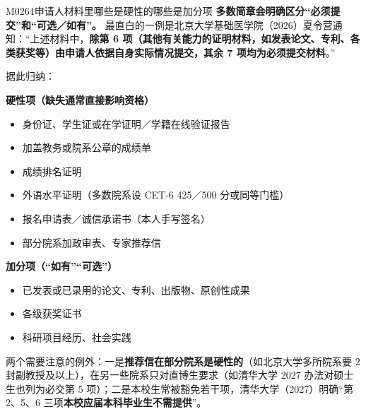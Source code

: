 \begin{qa}{M0264}{申请人材料里哪些是硬性的哪些是加分项}
\textbf{多数简章会明确区分“必须提交”和“可选／如有”。} 最直白的一例是北京大学基础医学院（2026）夏令营通知：“上述材料中，\textbf{除第 6 项（其他有关能力的证明材料，如发表论文、专利、各类获奖等）由申请人依据自身实际情况提交，其余 7 项均为必须提交材料}。”

据此归纳：

\textbf{硬性项（缺失通常直接影响资格）}
\begin{itemize}
  \item 身份证、学生证或在学证明／学籍在线验证报告
  \item 加盖教务或院系公章的成绩单
  \item 成绩排名证明
  \item 外语水平证明（多数院系设 CET-6 425／500 分或同等门槛）
  \item 报名申请表／诚信承诺书（本人手写签名）
  \item 部分院系加政审表、专家推荐信
\end{itemize}

\textbf{加分项（“如有”“可选”）}
\begin{itemize}
  \item 已发表或已录用的论文、专利、出版物、原创性成果
  \item 各级获奖证书
  \item 科研项目经历、社会实践
\end{itemize}

两个需要注意的例外：一是\textbf{推荐信在部分院系是硬性的}（如北京大学多所院系要 2 封副教授及以上），在另一些院系只对直博生要求（如清华大学 2027 办法对硕士生也列为必交第 5 项）；二是本校生常被豁免若干项，清华大学（2027）明确“第 2、5、6 三项\textbf{本校应届本科毕业生不需提供}”。
\end{qa}

